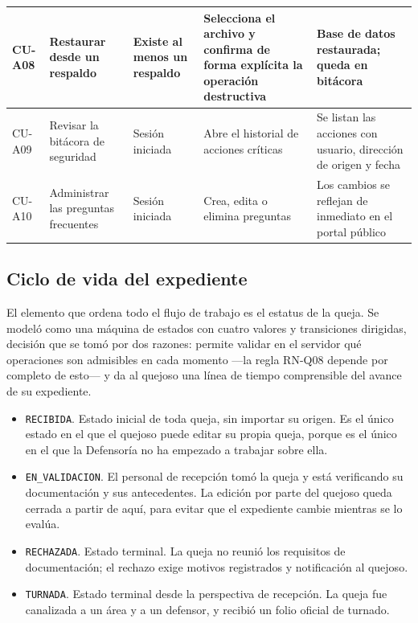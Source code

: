 \begin{longtable}{|p{1.5cm}|p{2.8cm}|p{2.6cm}|p{3.4cm}|p{3.4cm}|}
		CU-A08 & Restaurar desde un respaldo & Existe al menos un respaldo & Selecciona el archivo y
		confirma de forma explícita la operación destructiva & Base de datos restaurada; queda en
		bitácora \\ \hline
	
		CU-A09 & Revisar la bitácora de seguridad & Sesión iniciada & Abre el historial de acciones
		críticas & Se listan las acciones con usuario, dirección de origen y fecha \\ \hline
	
		CU-A10 & Administrar las preguntas frecuentes & Sesión iniciada & Crea, edita o elimina
		preguntas & Los cambios se reflejan de inmediato en el portal público \\ \hline
	\end{longtable}
	
	\normalsize
	\setlength{\tabcolsep}{6pt}
	\renewcommand{\arraystretch}{1}
	
	\subsection{Ciclo de vida del expediente}
	\label{sec:maquina_estados}
	El elemento que ordena todo el flujo de trabajo es el estatus de la queja. Se modeló como una
	máquina de estados con cuatro valores y transiciones dirigidas, decisión que se tomó por dos
	razones: permite validar en el servidor qué operaciones son admisibles en cada momento ---la
	regla RN-Q08 depende por completo de esto--- y da al quejoso una línea de tiempo comprensible
	del avance de su expediente.
	
	\begin{itemize}
		\item \texttt{RECIBIDA}. Estado inicial de toda queja, sin importar su origen. Es el único
		estado en el que el quejoso puede editar su propia queja, porque es el único en el que la
		Defensoría no ha empezado a trabajar sobre ella.
	
		\item \texttt{EN\_VALIDACION}. El personal de recepción tomó la queja y está verificando su
		documentación y sus antecedentes. La edición por parte del quejoso queda cerrada a partir de
		aquí, para evitar que el expediente cambie mientras se lo evalúa.
	
		\item \texttt{RECHAZADA}. Estado terminal. La queja no reunió los requisitos de
		documentación; el rechazo exige motivos registrados y notificación al quejoso.
	
		\item \texttt{TURNADA}. Estado terminal desde la perspectiva de recepción. La queja fue
		canalizada a un área y a un defensor, y recibió un folio oficial de turnado.
	\end{itemize}
	
